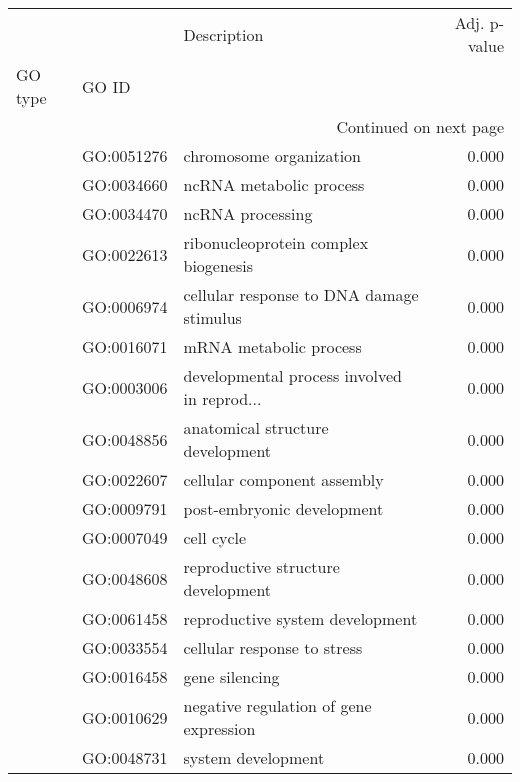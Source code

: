 \begin{longtable}{lllr}
\toprule
   &            &                                  Description &  Adj. p-value \\
GO type & GO ID &                                              &               \\
\midrule
\endhead
\midrule
\multicolumn{4}{r}{{Continued on next page}} \\
\midrule
\endfoot

\bottomrule
\endlastfoot
\multirow{342}{*}{BP} & GO:0051276 &                      chromosome organization &         0.000 \\
   & GO:0034660 &                      ncRNA metabolic process &         0.000 \\
   & GO:0034470 &                             ncRNA processing &         0.000 \\
   & GO:0022613 &         ribonucleoprotein complex biogenesis &         0.000 \\
   & GO:0006974 &     cellular response to DNA damage stimulus &         0.000 \\
   & GO:0016071 &                       mRNA metabolic process &         0.000 \\
   & GO:0003006 &  developmental process involved in reprod... &         0.000 \\
   & GO:0048856 &             anatomical structure development &         0.000 \\
   & GO:0022607 &                  cellular component assembly &         0.000 \\
   & GO:0009791 &                   post-embryonic development &         0.000 \\
   & GO:0007049 &                                   cell cycle &         0.000 \\
   & GO:0048608 &           reproductive structure development &         0.000 \\
   & GO:0061458 &              reproductive system development &         0.000 \\
   & GO:0033554 &                  cellular response to stress &         0.000 \\
   & GO:0016458 &                               gene silencing &         0.000 \\
   & GO:0010629 &       negative regulation of gene expression &         0.000 \\
   & GO:0048731 &                           system development &         0.000 \\

\end{longtable}
